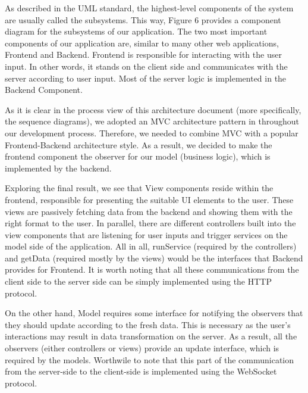 As described in the UML standard, the highest-level components of the system are usually called the subsystems. This way, Figure 6 provides a component diagram for the subsystems of our application. The two most important components of our application are, similar to many other web applications, Frontend and Backend. Frontend is responsible for interacting with the user input. In other words, it stands on the client side and communicates with the server according to user input. Most of the server logic is implemented in the Backend Component.

As it is clear in the process view of this architecture document (more specifically, the sequence diagrams), we adopted an MVC architecture pattern in throughout our development process. Therefore, we needed to combine MVC with a popular Frontend-Backend architecture style. As a result, we decided to make the frontend component the observer for our model (business logic), which is implemented by the backend.

Exploring the final result, we see that View components reside within the frontend, responsible for presenting the suitable UI elements to the user. These views are passively fetching data from the backend and showing them with the right format to the user.
In parallel, there are different controllers built into the view components that are listening for user inputs and trigger services on the model side of the application. All in all, runService (required by the controllers) and getData (required mostly by the views) would be the interfaces that Backend provides for Frontend. It is worth noting that all these communications from the client side to the server side can be simply implemented using the HTTP protocol.

On the other hand, Model requires some interface for notifying the observers that they should update according to the fresh data. This is necessary as the user's interactions may result in data transformation on the server. As a result, all the observers (either controllers or views) provide an update interface, which is required by the models. Worthwile to note that this part of the communication from the server-side to the client-side is implemented using the WebSocket protocol.